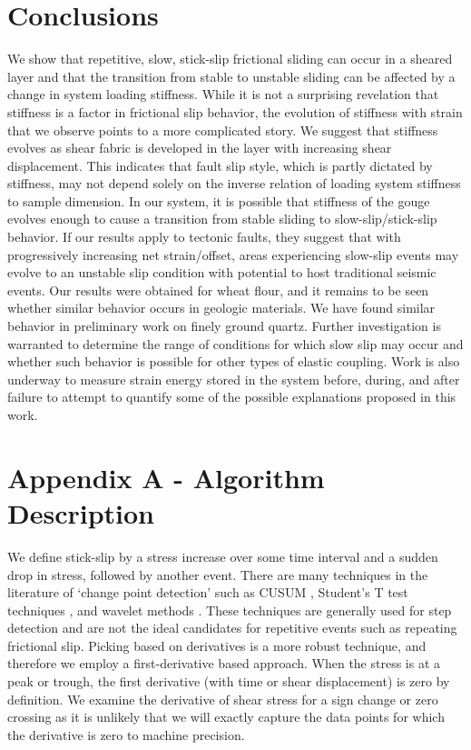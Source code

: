 \section{Conclusions}

We show that repetitive, slow, stick-slip frictional sliding can occur in a
sheared layer and that the transition from stable to unstable sliding can be
affected by a change in system loading stiffness.  While it is not a surprising
revelation that stiffness is a factor in frictional slip behavior, the evolution
of stiffness with strain that we observe points to a more complicated story. We
suggest that stiffness evolves as shear fabric is developed in the layer with
increasing shear displacement. This indicates that fault slip style, which is
partly dictated by stiffness, may not depend solely on the inverse relation of
loading system stiffness to sample dimension. In our system, it is possible that
stiffness of the gouge evolves enough to cause a transition from stable sliding
to slow-slip/stick-slip behavior. If our results apply to tectonic faults, they
suggest that with progressively increasing net strain/offset, areas experiencing
slow-slip events may evolve to an unstable slip condition with potential to host
traditional seismic events. Our results were obtained for wheat flour, and it
remains to be seen whether similar behavior occurs in geologic materials.  We
have found similar behavior in preliminary work on finely ground quartz. Further
investigation is warranted to determine the range of conditions for which slow
slip may occur and whether such behavior is possible for other types of elastic
coupling. Work is also underway to measure strain energy stored in the system
before, during, and after failure to attempt to quantify some of the possible
explanations proposed in this work.

\section{Appendix A - Algorithm Description}

We define stick-slip by a stress increase over some time interval and a sudden
drop in stress, followed by another event.  There are many techniques in the
literature of `change point detection' such as CUSUM \cite{page1954continuous},
Student's T test techniques \cite{buishand1982some}, and wavelet methods
\cite{raimondo2004peaks}.  These techniques are generally used for step
detection and are not the ideal candidates for repetitive events such as
repeating frictional slip.  Picking based on derivatives is a more robust
technique, and therefore we employ a first-derivative based approach.  When the
stress is at a peak or trough, the first derivative (with time or shear
displacement) is zero by definition.  We examine the derivative of shear stress
for a sign change or zero crossing as it is unlikely that we will exactly
capture the data points for which the derivative is zero to machine precision.

